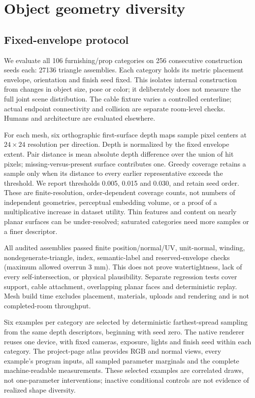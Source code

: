 \section{Object geometry diversity}
\label{sec:object-diversity}
\subsection{Fixed-envelope protocol}
We evaluate all 106 furnishing/prop categories on 256 consecutive construction seeds each: 27136 triangle assemblies. Each category holds its metric placement envelope, orientation and finish seed fixed. This isolates internal construction from changes in object size, pose or color; it deliberately does not measure the full joint scene distribution. The cable fixture varies a controlled centerline; actual endpoint connectivity and collision are separate room-level checks. Humans and architecture are evaluated elsewhere.

For each mesh, six orthographic first-surface depth maps sample pixel centers at $24\times24$ resolution per direction. Depth is normalized by the fixed envelope extent. Pair distance is mean absolute depth difference over the union of hit pixels; missing-versus-present surface contributes one. Greedy coverage retains a sample only when its distance to every earlier representative exceeds the threshold. We report thresholds 0.005, 0.015 and 0.030, and retain seed order. These are finite-resolution, order-dependent coverage counts, not numbers of independent geometries, perceptual embedding volume, or a proof of a multiplicative increase in dataset utility. Thin features and content on nearly planar surfaces can be under-resolved; saturated categories need more samples or a finer descriptor.

All audited assemblies passed finite position/normal/UV, unit-normal, winding, nondegenerate-triangle, index, semantic-label and reserved-envelope checks (maximum allowed overrun 3 mm). This does not prove watertightness, lack of every self-intersection, or physical plausibility. Separate regression tests cover support, cable attachment, overlapping planar faces and deterministic replay. Mesh build time excludes placement, materials, uploads and rendering and is not completed-room throughput.

Six examples per category are selected by deterministic farthest-spread sampling from the same depth descriptors, beginning with seed zero. The native renderer reuses one device, with fixed cameras, exposure, lights and finish seed within each category. The project-page atlas provides RGB and normal views, every example's program inputs, all sampled parameter marginals and the complete machine-readable measurements. These selected examples are correlated draws, not one-parameter interventions; inactive conditional controls are not evidence of realized shape diversity.

